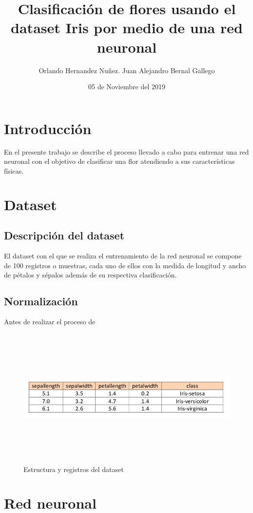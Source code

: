 \documentclass[11pt]{article}
\begin{document}
\title{ Clasificaci\'on de flores usando el dataset Iris por medio de una red neuronal }
\author{Orlando Hernandez Nu\~nez. Juan Alejandro Bernal Gallego}
\date{05 de Noviembre del 2019}
\maketitle
\section{Introducci\'on}
En el presente trabajo se describe el proceso llevado a cabo para entrenar una red neuronal con el objetivo de clasificar una flor atendiendo a sus caracter\'isticas f\'isicas.
\section{Dataset}
\subsection{Descripci\'on del dataset}
El dataset con el que se realiza el entrenamiento de la red neuronal se compone de 100 registros o muestras,
cada uno de ellos con la medida de longitud y ancho de p\'etalos y s\'epalos adem\'as de su respectiva clasificaci\'on.
\subsection{Normalizaci\'on}
Antes de realizar el proceso de 
\begin{figure}[H]
    \includegraphics[width=13cm, height=7cm]{dt_example}
    \centering
    \caption{Estructura y registros del dataset}
    \label{fig:dt_example}
\end{figure}
\section{Red neuronal}
\end{document}

